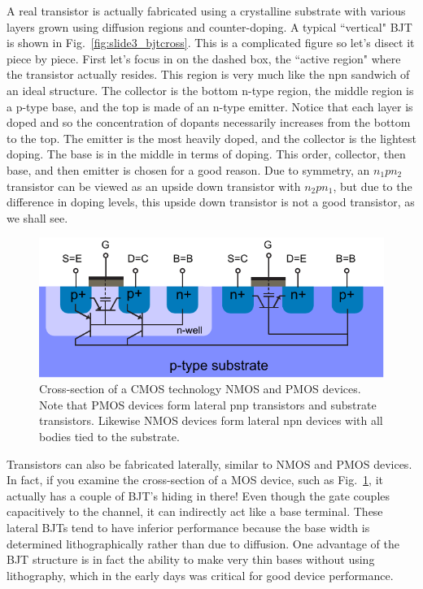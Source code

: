 A real transistor is actually fabricated using a crystalline substrate with various layers grown using diffusion regions and counter-doping.  A typical ``vertical" BJT is shown in Fig.~\ref{fig:slide3_bjtcross}.  This is a complicated figure so let's disect it piece by piece.   First let's focus in on the dashed box, the ``active region" where the transistor actually resides.  This region is very much like the npn sandwich of an ideal structure.  The collector is the bottom n-type region, the middle region is a p-type base, and the top is made of an n-type emitter.  Notice that each layer is doped and so the concentration of dopants necessarily increases from the bottom to the top. The emitter is the most heavily doped, and the collector is the lightest doping. The base is in the middle in terms of doping.  This order, collector, then base, and then emitter is chosen for a good reason.  Due to symmetry, an $n_1 p n_2$ transistor can be viewed as an upside down transistor with $n_2 p n_1$, but due to the difference in doping levels, this upside down transistor is not a good transistor, as we shall see.  
\begin{figure}[tb]
\begin{center}
\includegraphics[width=.75\columnwidth]{mos_bjt}
\end{center}
\caption{Cross-section of a CMOS technology NMOS and PMOS devices.  Note that PMOS devices form lateral pnp transistors and substrate transistors.  Likewise NMOS devices form lateral npn devices with all bodies tied to the substrate.}
\label{fig:mos_bjt}
\end{figure}

Transistors can also be fabricated laterally, similar to NMOS and PMOS devices.  In fact, if you examine the cross-section of a MOS device, such as Fig.~\ref{fig:mos_bjt}, it actually has a couple of BJT's hiding in there!  Even though the gate couples capacitively to the channel, it can indirectly act like a base terminal.  These lateral BJTs tend to have inferior performance because the base width is determined lithographically rather than due to diffusion. One advantage of the BJT structure is in fact the ability to make very thin bases without using lithography, which in the early days was critical for good device performance.

